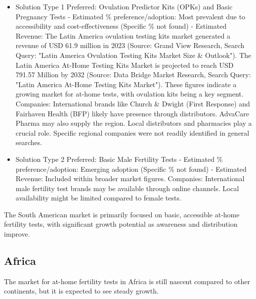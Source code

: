 \documentclass{article}
\begin{document}
\begin{itemize}
  \item Solution Type 1 Preferred: Ovulation Predictor Kits (OPKs) and Basic Pregnancy Tests - Estimated \% preference/adoption: Most prevalent due to accessibility and cost-effectiveness (Specific \% not found) - Estimated Revenue: The Latin America ovulation testing kits market generated a revenue of USD 61.9 million in 2023 (Source: Grand View Research, Search Query: "Latin America Ovulation Testing Kits Market Size & Outlook"). The Latin America At-Home Testing Kits Market is projected to reach USD 791.57 Million by 2032 (Source: Data Bridge Market Research, Search Query: "Latin America At-Home Testing Kits Market"). These figures indicate a growing market for at-home tests, with ovulation kits being a key segment.
    Companies: International brands like Church \& Dwight (First Response) and Fairhaven Health (BFP) likely have presence through distributors. AdvaCare Pharma may also supply the region. Local distributors and pharmacies play a crucial role. Specific regional companies were not readily identified in general searches.
  \item Solution Type 2 Preferred: Basic Male Fertility Tests - Estimated \% preference/adoption: Emerging adoption (Specific \% not found) - Estimated Revenue: Included within broader market figures.
    Companies: International male fertility test brands may be available through online channels. Local availability might be limited compared to female tests.
\end{itemize}
The South American market is primarily focused on basic, accessible at-home fertility tests, with significant growth potential as awareness and distribution improve.

\subsection{Africa}
The market for at-home fertility tests in Africa is still nascent compared to other continents, but it is expected to see steady growth.
\end{document}
